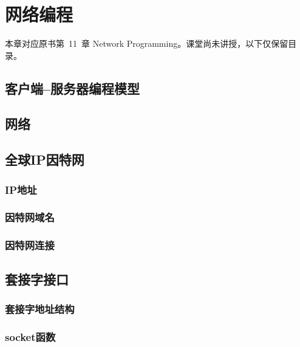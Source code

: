 \chapter{网络编程}

本章对应原书第~11~章 Network Programming。课堂尚未讲授，以下仅保留目录。

\section{客户端--服务器编程模型}

\pending

\section{网络}

\pending

\section{全球IP因特网}

\pending

\subsection{IP地址}

\pending

\subsection{因特网域名}

\pending

\subsection{因特网连接}

\pending

\section{套接字接口}

\pending

\subsection{套接字地址结构}

\pending

\subsection{socket函数}

